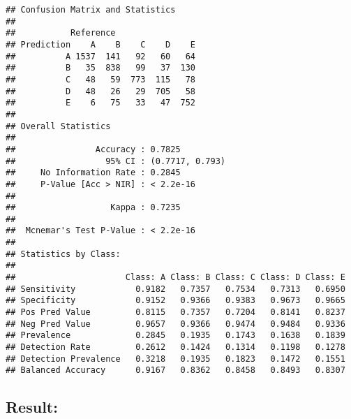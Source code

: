 \documentclass[
]{article}
\newenvironment{Shaded}{\begin{snugshade}}{\end{snugshade}}
\newcommand{\AttributeTok}[1]{\textcolor[rgb]{0.77,0.63,0.00}{#1}}
\newcommand{\ConstantTok}[1]{\textcolor[rgb]{0.00,0.00,0.00}{#1}}
\newcommand{\DecValTok}[1]{\textcolor[rgb]{0.00,0.00,0.81}{#1}}
\newcommand{\FunctionTok}[1]{\textcolor[rgb]{0.00,0.00,0.00}{#1}}
\newcommand{\NormalTok}[1]{#1}
\newcommand{\OtherTok}[1]{\textcolor[rgb]{0.56,0.35,0.01}{#1}}
\newcommand{\SpecialCharTok}[1]{\textcolor[rgb]{0.00,0.00,0.00}{#1}}
\newcommand{\StringTok}[1]{\textcolor[rgb]{0.31,0.60,0.02}{#1}}
\begin{document}
\begin{Shaded}
\end{Shaded}

\begin{verbatim}
## Confusion Matrix and Statistics
## 
##           Reference
## Prediction    A    B    C    D    E
##          A 1537  141   92   60   64
##          B   35  838   99   37  130
##          C   48   59  773  115   78
##          D   48   26   29  705   58
##          E    6   75   33   47  752
## 
## Overall Statistics
##                                          
##                Accuracy : 0.7825         
##                  95% CI : (0.7717, 0.793)
##     No Information Rate : 0.2845         
##     P-Value [Acc > NIR] : < 2.2e-16      
##                                          
##                   Kappa : 0.7235         
##                                          
##  Mcnemar's Test P-Value : < 2.2e-16      
## 
## Statistics by Class:
## 
##                      Class: A Class: B Class: C Class: D Class: E
## Sensitivity            0.9182   0.7357   0.7534   0.7313   0.6950
## Specificity            0.9152   0.9366   0.9383   0.9673   0.9665
## Pos Pred Value         0.8115   0.7357   0.7204   0.8141   0.8237
## Neg Pred Value         0.9657   0.9366   0.9474   0.9484   0.9336
## Prevalence             0.2845   0.1935   0.1743   0.1638   0.1839
## Detection Rate         0.2612   0.1424   0.1314   0.1198   0.1278
## Detection Prevalence   0.3218   0.1935   0.1823   0.1472   0.1551
## Balanced Accuracy      0.9167   0.8362   0.8458   0.8493   0.8307
\end{verbatim}

\hypertarget{result}{%
\subsection{Result:}\label{result}}
\end{document}
